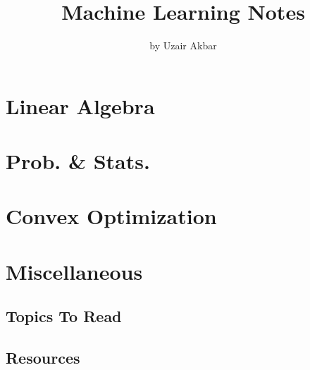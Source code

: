 \documentclass[runningheads,a4paper]{llncs}
\begin{document}
\mainmatter 

\title{Machine Learning Notes}
\author{by Uzair Akbar}
\institute{}
{\def\addcontentsline#1#2#3{}\maketitle}
\medskip
\begingroup
\let\clearpage\relax
\tableofcontents
\endgroup
\medskip
\medskip

\section{Linear Algebra}

\section{Prob. \& Stats.}

\section{Convex Optimization}

\appendix
\section{Miscellaneous}
\subsection{Topics To Read}
\subsection{Resources}



\end{document}
